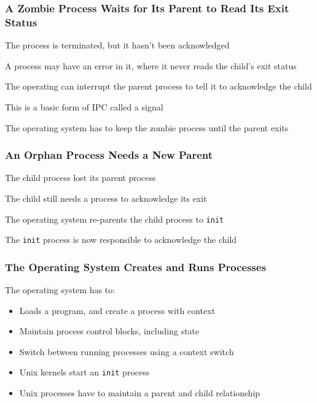   \begin{frame}
    \frametitle{A Zombie Process Waits for Its Parent to Read Its Exit Status}

    The process is terminated, but it hasn't been acknowledged

    \vspace{2em}

    A process may have an error in it, where it never reads the child's exit status

    \vspace{2em}

    The operating can interrupt the parent process to tell it to acknowledge the child

    \hspace{2em} This is a basic form of IPC called a signal

    \vspace{4em}

    The operating system has to keep the zombie process until the parent exits
  \end{frame}

  \begin{frame}
    \frametitle{An Orphan Process Needs a New Parent}

    The child process lost its parent process

    \hspace{2em} The child still needs a process to acknowledge its exit

    \vspace{2em}

    The operating system re-parents the child process to \texttt{init}

    \hspace{2em} The \texttt{init} process is now responsible to acknowledge the
                 child
  \end{frame}

  \begin{frame}
    \frametitle{The Operating System Creates and Runs Processes}

    The operating system has to:
    \begin{itemize}
      \item Loads a program, and create a process with context
      \item Maintain process control blocks, including state
      \item Switch between running processes using a context switch
      \item Unix kernels start an \texttt{init} process
      \item Unix processes have to maintain a parent and child relationship
    \end{itemize}
  \end{frame}

